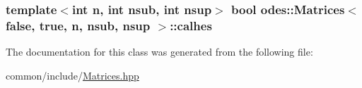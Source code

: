 \subsubsection[{calhes}]{\setlength{\rightskip}{0pt plus 5cm}template$<$int n, int nsub, int nsup$>$ bool {\bf odes\+::\+Matrices}$<$ false, true, n, nsub, nsup $>$\+::calhes\hspace{0.3cm}{\ttfamily [protected]}}\label{classodes_1_1Matrices_3_01false_00_01true_00_01n_00_01nsub_00_01nsup_01_4_a69754fb4b71b97a43059ba4cd1d1afee}


The documentation for this class was generated from the following file\+:\begin{DoxyCompactItemize}
\item 
common/include/\hyperlink{Matrices_8hpp}{Matrices.\+hpp}\end{DoxyCompactItemize}
